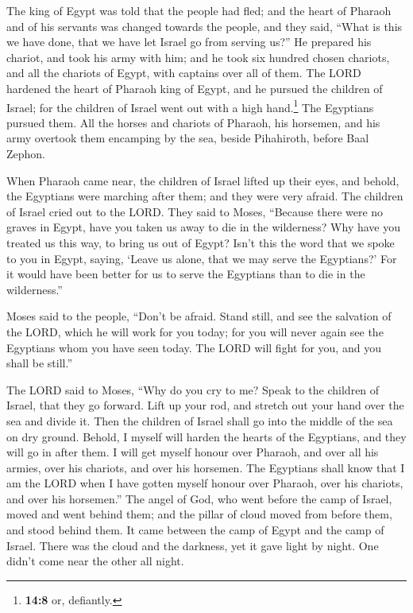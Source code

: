  The king of Egypt was told that the people had fled; and
the heart of Pharaoh and of his servants was changed towards the people,
and they said, ``What is this we have done, that we have let Israel go
from serving us?''  He prepared his chariot, and took his
army with him;  and he took six hundred chosen chariots,
and all the chariots of Egypt, with captains over all of them.
 The LORD hardened the heart of Pharaoh king of Egypt, and
he pursued the children of Israel; for the children of Israel went out
with a high hand.\footnote{\textbf{14:8} or, defiantly.} 
The Egyptians pursued them. All the horses and chariots of Pharaoh, his
horsemen, and his army overtook them encamping by the sea, beside
Pihahiroth, before Baal Zephon.

 When Pharaoh came near, the children of Israel lifted up
their eyes, and behold, the Egyptians were marching after them; and they
were very afraid. The children of Israel cried out to the LORD.
 They said to Moses, ``Because there were no graves in
Egypt, have you taken us away to die in the wilderness? Why have you
treated us this way, to bring us out of Egypt?  Isn't
this the word that we spoke to you in Egypt, saying, `Leave us alone,
that we may serve the Egyptians?' For it would have been better for us
to serve the Egyptians than to die in the wilderness.''

 Moses said to the people, ``Don't be afraid. Stand
still, and see the salvation of the LORD, which he will work for you
today; for you will never again see the Egyptians whom you have seen
today.  The LORD will fight for you, and you shall be
still.''

 The LORD said to Moses, ``Why do you cry to me? Speak to
the children of Israel, that they go forward.  Lift up
your rod, and stretch out your hand over the sea and divide it. Then the
children of Israel shall go into the middle of the sea on dry ground.
 Behold, I myself will harden the hearts of the
Egyptians, and they will go in after them. I will get myself honour over
Pharaoh, and over all his armies, over his chariots, and over his
horsemen.  The Egyptians shall know that I am the LORD
when I have gotten myself honour over Pharaoh, over his chariots, and
over his horsemen.''  The angel of God, who went before
the camp of Israel, moved and went behind them; and the pillar of cloud
moved from before them, and stood behind them.  It came
between the camp of Egypt and the camp of Israel. There was the cloud
and the darkness, yet it gave light by night. One didn't come near the
other all night.


